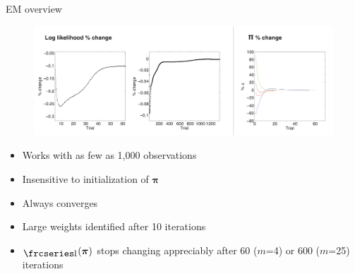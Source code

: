 \documentclass{beamer}
\newcommand{\textfrc}[1]{{\frcseries#1}}
\newcommand{\mathfrc}[1]{\raisebox{-0.8mm}{\text{\textfrc{\small #1}}}\hspace{0.4mm}}
\newcommand{\vect}[1]{\boldsymbol{\mathbf{#1}}}
\newcommand{\llp}{\mathfrc{l}(\vect{\pi})}
\begin{document}
\begin{frame}{EM overview}
	
	\begin{figure}
			\begin{center}
				\includegraphics[width=\textwidth]{diag_simple.pdf}
			\end{center}
	\end{figure}
	
	\begin{itemize}
		\item Works with as few as 1,000 observations
		\item Insensitive to initialization of $\vect{\pi}$
		\item Always converges
		\item Large weights identified after 10 iterations
		\item $\llp$ stops changing appreciably after 60 ($m$=4) or 600 ($m$=25) iterations
	\end{itemize}
	
	
	
\end{frame}
\end{document}
